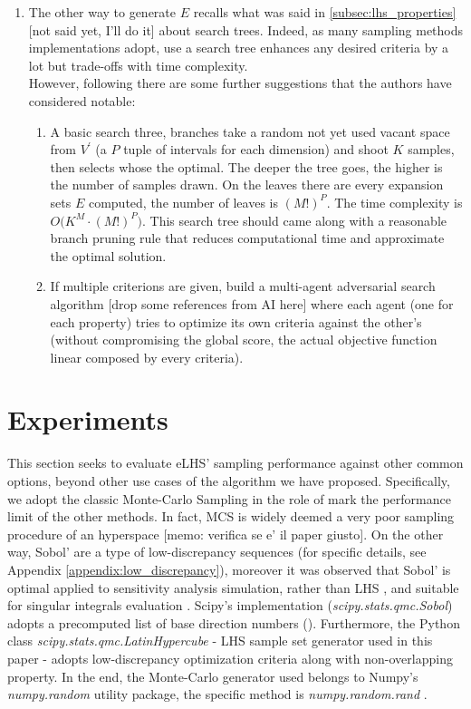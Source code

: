 \documentclass[12pt]{extarticle}
\newcommand{\mappendixref}[1]{Appendix \ref{#1}}
\begin{document}
\begin{enumerate}
\begin{enumerate}
	\item The other way to generate $E$ recalls what was said in \cref{subsec:lhs_properties} [not said yet, I'll do it] about search trees. Indeed, as many sampling methods implementations adopt, use a search tree enhances any desired criteria by a lot but trade-offs with time complexity. \\
	However, following there are some further suggestions that the authors have considered notable:
	\begin{enumerate}
		\item A basic search three, branches take a random not yet used vacant space from $V^\prime$ (a $P$ tuple of intervals for each dimension) and shoot $K$ samples, then selects whose the optimal. The deeper the tree goes, the higher is the number of samples drawn. On the leaves there are every expansion sets $E$ computed, the number of leaves is $(M!)^P$. The time complexity is $O\big( K^M \cdot (M!)^P\big)$. This search tree should came along with a reasonable branch pruning rule that reduces computational time and approximate the optimal solution.
		
		\item If multiple criterions are given, build a multi-agent adversarial search algorithm [drop some references from AI here] where each agent (one for each property) tries to optimize its own criteria against the other's (without compromising the global score, the actual objective function linear composed by every criteria).
	
	\end{enumerate}


\end{enumerate}
\end{enumerate}


\section{Experiments}
\label{sec:experiments}
This section seeks to evaluate eLHS' sampling performance against other common options, beyond other use cases of the algorithm we have proposed. Specifically, we adopt the classic Monte-Carlo Sampling in the role of mark the performance limit of the other methods. In fact, MCS is widely deemed a very poor sampling procedure of an hyperspace [memo: verifica se e' il paper giusto]. On the other way, Sobol' are a type of low-discrepancy sequences (for specific details, see \mappendixref{appendix:low_discrepancy}), moreover it was observed that Sobol' is optimal applied to sensitivity analysis simulation, rather than LHS , and suitable for singular integrals evaluation . Scipy's implementation (\emph{scipy.stats.qmc.Sobol}) adopts a precomputed list of base direction numbers (). Furthermore, the Python class \emph{scipy.stats.qmc.LatinHypercube} - LHS sample set generator used in this paper - adopts low-discrepancy optimization criteria along with non-overlapping property. In the end, the Monte-Carlo generator used belongs to Numpy's \emph{numpy.random} utility package, the specific method is \emph{numpy.random.rand} .
\end{document}
